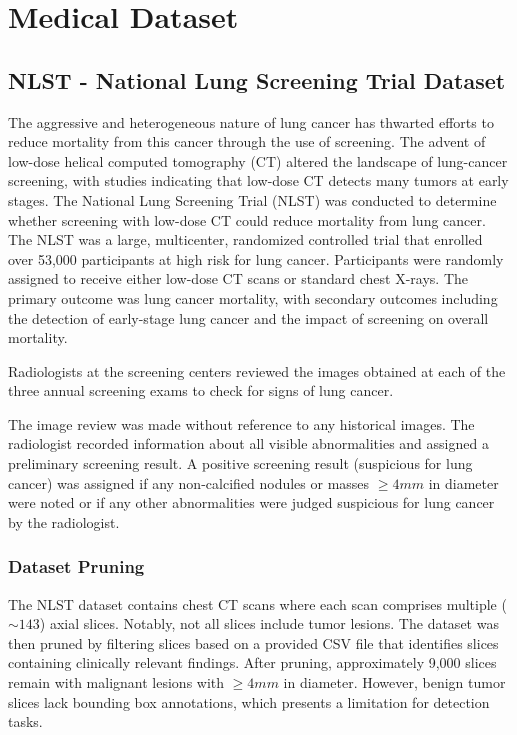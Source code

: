 \chapter{Medical Dataset}

\section{NLST - National Lung Screening Trial Dataset}
The aggressive and heterogeneous nature of lung cancer has thwarted efforts to reduce mortality from this cancer through the use of screening. 
The advent of low-dose helical computed tomography (CT) altered the landscape of lung-cancer screening, with studies indicating that low-dose CT detects many tumors at early stages.
 The National Lung Screening Trial (NLST) was conducted to determine whether screening with low-dose CT could reduce mortality from lung cancer.
The NLST was a large, multicenter, randomized controlled trial that enrolled over 53,000 participants at high risk for lung cancer. 
Participants were randomly assigned to receive either low-dose CT scans or standard chest X-rays. 
The primary outcome was lung cancer mortality, with secondary outcomes including the detection of early-stage lung cancer and the impact of screening on overall mortality.

Radiologists at the screening centers reviewed the images obtained at each of the three annual screening exams to check for signs of lung cancer.

The image review was made without reference to any historical images. The radiologist recorded information about all visible abnormalities and assigned a preliminary screening result. A positive screening result (suspicious for lung cancer) was assigned if any non-calcified nodules or masses $\geq 4 mm$ in diameter were noted or if any other abnormalities were judged suspicious for lung cancer by the radiologist.

\subsection{Dataset Pruning}
The NLST dataset contains chest CT scans where each scan comprises multiple ($\sim 143$) axial slices. 
Notably, not all slices include tumor lesions. The dataset was then pruned by filtering slices based on a provided CSV file that identifies slices containing clinically relevant findings. After pruning, approximately 9,000 slices remain with malignant lesions with $\geq 4 mm$ in diameter. 
However, benign tumor slices lack bounding box annotations, which presents a limitation for detection tasks.


